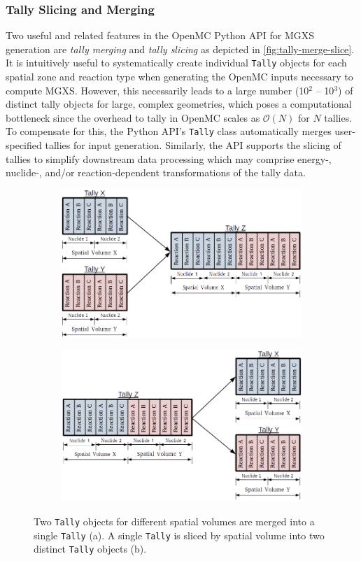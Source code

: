 \subsubsection{Tally Slicing and Merging}
\label{subsubsec:tally-slice-merge}

Two useful and related features in the OpenMC Python API for MGXS generation are \textit{tally merging} and \textit{tally slicing} as depicted in \autoref{fig:tally-merge-slice}. It is intuitively useful to systematically create individual \texttt{Tally} objects for each spatial zone and reaction type when generating the OpenMC inputs necessary to compute MGXS. However, this necessarily leads to a large number (10$^2$ -- 10$^3$) of distinct tally objects for large, complex geometries, which poses a computational bottleneck since the overhead to tally in OpenMC scales as $\mathcal{O}(N)$ for $N$ tallies. To compensate for this, the Python API's \texttt{Tally} class automatically merges user-specified tallies for input generation. Similarly, the API supports the slicing of tallies to simplify downstream data processing which may comprise energy-, nuclide-, and/or reaction-dependent transformations of the tally data.

\begin{figure}
\begin{subfigure}{\textwidth}
  \centering
  \includegraphics[width=0.8\linewidth]{figures/tally-merge}
  \caption{}
\end{subfigure}
\begin{subfigure}{\textwidth}
  \centering
  \includegraphics[width=0.8\linewidth]{figures/tally-slice}
  \caption{}
\end{subfigure}
\caption{Two \texttt{Tally} objects for different spatial volumes are merged into a single \texttt{Tally} (a). A single \texttt{Tally} is sliced by spatial volume into two distinct \texttt{Tally} objects (b).}
\label{fig:tally-merge-slice}
\end{figure}

